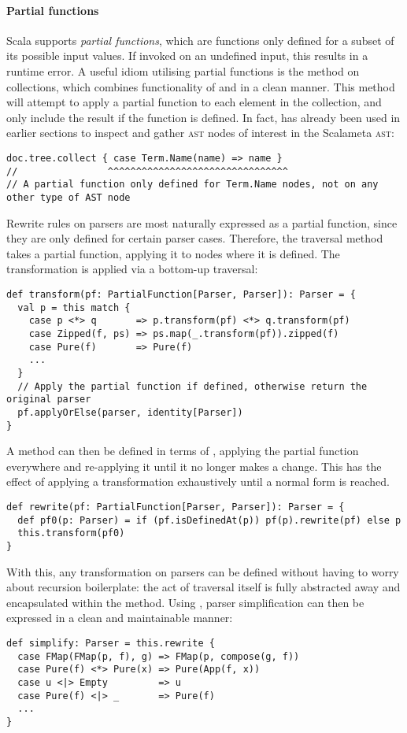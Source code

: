 \documentclass[../../../main.tex]{subfiles}
\begin{document}
\paragraph{Partial functions}
Scala supports \emph{partial functions}, which are functions only defined for a subset of its possible input values.
If invoked on an undefined input, this results in a runtime error.
A useful idiom utilising partial functions is the  method on collections, which combines functionality of  and  in a clean manner.
This method will attempt to apply a partial function to each element in the collection, and only include the result if the function is defined.
In fact,  has already been used in earlier sections to inspect and gather \textsc{ast} nodes of interest in the Scalameta \textsc{ast}:
\begin{verbatim}
doc.tree.collect { case Term.Name(name) => name }
//                ^^^^^^^^^^^^^^^^^^^^^^^^^^^^^^^^
// A partial function only defined for Term.Name nodes, not on any other type of AST node
\end{verbatim}
%
Rewrite rules on parsers are most naturally expressed as a partial function, since they are only defined for certain parser cases.
Therefore, the traversal method \scala{transform} takes a partial function, applying it to nodes where it is defined.
The transformation is applied via a bottom-up traversal:
\begin{verbatim}
def transform(pf: PartialFunction[Parser, Parser]): Parser = {
  val p = this match {
    case p <*> q       => p.transform(pf) <*> q.transform(pf)
    case Zipped(f, ps) => ps.map(_.transform(pf)).zipped(f)
    case Pure(f)       => Pure(f)
    ...
  }
  // Apply the partial function if defined, otherwise return the original parser
  pf.applyOrElse(parser, identity[Parser])
}
\end{verbatim}
%
A  method can then be defined in terms of , applying the partial function everywhere and re-applying it until it no longer makes a change.
This has the effect of applying a transformation exhaustively until a normal form is reached.
\begin{verbatim}
def rewrite(pf: PartialFunction[Parser, Parser]): Parser = {
  def pf0(p: Parser) = if (pf.isDefinedAt(p)) pf(p).rewrite(pf) else p
  this.transform(pf0)
}
\end{verbatim}
%
With this, any transformation on parsers can be defined without having to worry about recursion boilerplate: the act of traversal itself is fully abstracted away and encapsulated within the  method.
Using \scala{rewrite}, parser simplification can then be expressed in a clean and maintainable manner:
\begin{verbatim}
def simplify: Parser = this.rewrite {
  case FMap(FMap(p, f), g) => FMap(p, compose(g, f))
  case Pure(f) <*> Pure(x) => Pure(App(f, x))
  case u <|> Empty         => u
  case Pure(f) <|> _       => Pure(f)
  ...
}
\end{verbatim}
%
\end{document}
